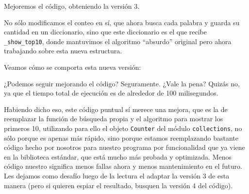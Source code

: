 Mejoremos el código, obteniendo la versión 3.


No sólo modificamos el conteo en sí, que ahora busca cada palabra y guarda su cantidad en un diccionario, sino que este diccionario es el que recibe \texttt{\_show\_top10}, donde mantuvimos el algoritmo ``absurdo'' original pero ahora trabajando sobre esta nueva estructura.

Veamos cómo se comporta esta nueva versión:


¿Podemos seguir mejorando el código? Seguramente. ¿Vale la pena? Quizás no, ya que el tiempo total de ejecución es de alrededor de 100 milisegundos.

Habiendo dicho eso, este código puntual sí merece una mejora, que es la de reemplazar la función de búsqueda propia y el algoritmo para mostrar los primeros 10, utilizando para ello el objeto \texttt{Counter} del módulo \texttt{collections}, no sólo porque es apenas más rápido, sino porque estamos reemplazando bastante código hecho por nosotros para nuestro programa por funcionalidad que ya viene en la biblioteca estándar, que está mucho más probada y optimizada. Menos código nuestro significa menos fallas ahora y menos mantenimiento en el futuro. Les dejamos como desafío luego de la lectura el adaptar la versión 3 de esta manera (pero si quieren espiar el resultado, busquen la versión 4 del código).

